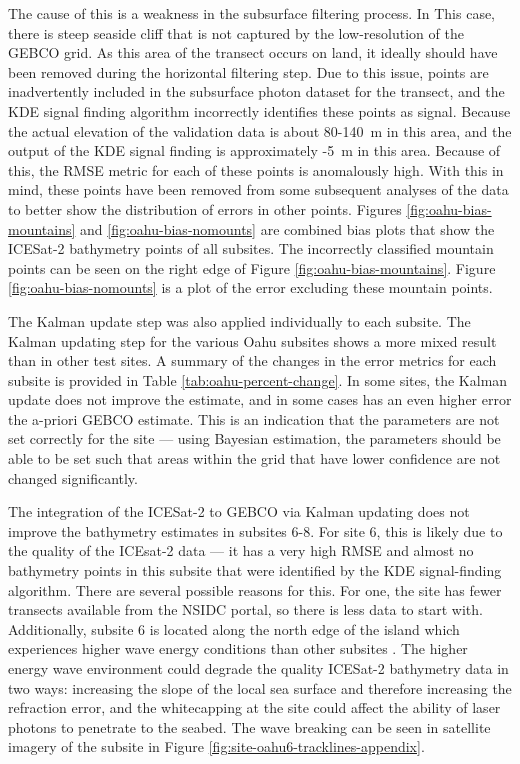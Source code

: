 The cause of this is a weakness in the subsurface filtering process. In This case, there is steep seaside cliff that is not captured by the low-resolution of the GEBCO grid. As this area of the transect occurs on land, it ideally should have been removed during the horizontal filtering step. Due to this issue, points are inadvertently included in the subsurface photon dataset for the transect, and the KDE signal finding algorithm incorrectly identifies these points as signal. Because the actual elevation of the validation data is about 80-140~m in this area, and the output of the KDE signal finding is approximately -5~m in this area. Because of this, the RMSE metric for each of these points is anomalously high. With this in mind, these points have been removed from some subsequent analyses of the data to better show the distribution of errors in other points. Figures \ref{fig:oahu-bias-mountains} and \ref{fig:oahu-bias-nomounts} are combined bias plots that show the ICESat-2 bathymetry points of all subsites. The incorrectly classified mountain points can be seen on the right edge of Figure \ref{fig:oahu-bias-mountains}. Figure \ref{fig:oahu-bias-nomounts} is a plot of the error excluding these mountain points.

The Kalman update step was also applied individually to each subsite. The Kalman updating step for the various Oahu subsites shows a more mixed result than in other test sites. A summary of the changes in the error metrics for each subsite is provided in Table \ref{tab:oahu-percent-change}. In some sites, the Kalman update does not improve the estimate, and in some cases has an even higher error the a-priori GEBCO estimate. This is an indication that the parameters are not set correctly for the site --- using Bayesian estimation, the parameters should be able to be set such that areas within the grid that have lower confidence are not changed significantly.

The integration of the ICESat-2 to GEBCO via Kalman updating does not improve the bathymetry estimates in subsites 6-8. For site 6, this is likely due to the quality of the ICEsat-2 data --- it has a very high RMSE and almost no bathymetry points in this subsite that were identified by the KDE signal-finding algorithm. There are several possible reasons for this. For one, the site has fewer transects available from the NSIDC portal, so there is less data to start with. Additionally, subsite 6 is located along the north edge of the island which experiences higher wave energy conditions than other subsites \parencite{Vitousek2008a}. The higher energy wave environment could degrade the quality ICESat-2 bathymetry data in two ways: increasing the slope of the local sea surface and therefore increasing the refraction error, and the whitecapping at the site could affect the ability of laser photons to penetrate to the seabed. The  wave breaking can be seen in satellite imagery of the subsite in Figure \ref{fig:site-oahu6-tracklines-appendix}.

